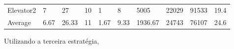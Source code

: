 \documentclass[a4paper]{article}
\begin{document}
\begin{table}[h]
\begin{tabular}{@{}llllllllll@{}}
Elevator2 & 7        & 27            & 10           & 1                                                               & 8                                                                  & 5005                                                         & 22029                                                 & 91533                                                   & 19.4         \\
Average   & 6.67     & 26.33         & 11        & 1.67                                                            & 9.33                                                               & 1936.67                                                         & 24743                                                 & 76107                                                   &  24.6         \\ \bottomrule
\end{tabular}
\end{table}

\newpage

Utilizando a terceira estratégia,
\end{document}
